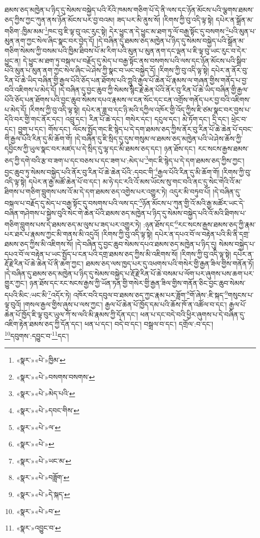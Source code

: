 ཐམས་ཅད་མཁྱེན་པ་ཉིད་དུ་སེམས་བསྐྱེད་པའི་རོའི་ཁམས་གཅིག་པོ་དེ་ནི་ལས་དང་ཉོན་མོངས་པའི་ལྕགས་ཐམས་ཅད་ཀྱིས་ཀྱང་ཀུན་ནས་ཉོན་མོངས་པར་བྱ་བའམ། ཟད་པར་མི་ནུས་སོ། །རིགས་ཀྱི་བུ་འདི་ལྟ་སྟེ། དཔེར་ན་སྒྲོན་མ་གཅིག་:ཁྱིམ་མམ་\footnote{«སྣར་»«པེ་»ཁྱིམ་}ཁང་བུ་ཇི་ལྟ་བུ་འང་རུང་སྟེ། དེར་ཕྱུང་ན་དེ་ཕྱུང་མ་ཐག་ཏུ་ལོ་བརྒྱ་སྟོང་དུ་བསགས་\footnote{«སྣར་»«པེ་»བསགས་བསགས་}པའི་མུན་པ་མུན་ནག་ཀྱང་སེལ་ཞིང་སྣང་བར་བྱེད་དོ། །དེ་བཞིན་དུ་ཐམས་ཅད་མཁྱེན་པ་ཉིད་དུ་སེམས་བསྐྱེད་པའི་སྒྲོན་མ་གཅིག་སེམས་ཀྱི་བསམ་པའི་ཁྱིམ་ཐིབས་པོ་མ་རིག་པའི་མུན་པ་མུན་ནག་དང་ལྡན་པ་ཇི་ལྟ་བུ་ཡང་རུང་བ་དེར་ཕྱུང་ན། དེ་ཕྱུང་མ་ཐག་ཏུ་བསྐལ་པ་བརྗོད་དུ་མེད་པ་བརྒྱ་སྟོང་ནས་བསགས་པའི་ལས་དང་ཉོན་མོངས་པའི་སྒྲིབ་པའི་མུན་པ་མུན་ནག་ཀྱང་སེལ་ཞིང་ཡེ་ཤེས་ཀྱི་སྣང་བ་ཡང་བསྐྱེད་དོ། །རིགས་ཀྱི་བུ་འདི་ལྟ་སྟེ། དཔེར་ན་ནོར་བུ་རིན་པོ་ཆེ་ཡིད་བཞིན་གྱི་རྒྱལ་པོའི་ཅོད་པན་ཐོགས་པའི་ཀླུའི་རྒྱལ་པོ་ཆེན་པོ་རྣམས་ལ་གཞན་གྱིས་གནོད་པ་བྱ་བའི་འཇིགས་པ་མེད་དོ། །དེ་བཞིན་དུ་བྱང་ཆུབ་ཀྱི་སེམས་སྙིང་རྗེ་ཆེན་པོའི་ནོར་བུ་རིན་པོ་ཆེ་ཡིད་བཞིན་གྱི་རྒྱལ་པོའི་ཅོད་པན་ཐོགས་པའི་བྱང་ཆུབ་སེམས་དཔའ་རྣམས་ལ་ངན་སོང་དང་ངན་འགྲོས་གནོད་པར་བྱ་བའི་འཇིགས་པ་མེད་དོ། །རིགས་ཀྱི་བུ་འདི་ལྟ་སྟེ། དཔེར་ན་ཟླ་བ་དང་ཉི་མའི་དཀྱིལ་འཁོར་གྱི་འོད་ཀྱིས་ཇི་ཙམ་སྣང་བར་བྱས་པ་དེའི་བར་གྱི་གང་ནོར་དང་། འབྲུ་དང་། རིན་པོ་ཆེ་དང་། གསེར་དང་། དངུལ་དང་། མེ་ཏོག་དང་། དྲི་དང་། ཕྲེང་བ་དང་། བྱུག་པ་དང་། གོས་དང་། ལོངས་སྤྱོད་གང་ཇི་སྙེད་པ་དེ་དག་ཐམས་ཅད་ཀྱིས་ནོར་བུ་རིན་པོ་ཆེ་ཆེན་པོ་དབང་གི་རྒྱལ་པོའི་རིན་དུ་མི་ཆོག་གོ། །དེ་བཞིན་དུ་ཇི་སྲིད་དུ་དུས་གསུམ་ལ་ཐམས་ཅད་མཁྱེན་པའི་ཡེ་ཤེས་ཆོས་ཀྱི་དབྱིངས་ཀྱི་ཡུལ་སྣང་བར་མཛད་པ་དེ་སྲིད་དུ་ལྷ་དང་མི་ཐམས་ཅད་དང་། ཉན་ཐོས་དང་། རང་སངས་རྒྱས་ཐམས་ཅད་ཀྱི་དགེ་བའི་རྩ་བ་ཟག་པ་དང་བཅས་པ་དང་ཟག་པ་:མེད་པ་\footnote{«སྣར་»«པེ་»མེད་པའི་}གང་ཇི་སྙེད་པ་དེ་དག་ཐམས་ཅད་ཀྱིས་ཀྱང་། བྱང་ཆུབ་ཏུ་སེམས་བསྐྱེད་པའི་ནོར་བུ་རིན་པོ་ཆེ་ཆེན་པོའི་:དབང་གི་\footnote{«སྣར་»«པེ་»དབང་གིས་}རྒྱལ་པོའི་རིན་དུ་མི་ཆོག་གོ། །རིགས་ཀྱི་བུ་འདི་ལྟ་སྟེ། དཔེར་ན་རྒྱ་མཚོ་ཆེན་པོ་བ་དང་། མ་ཧེ་དང་རའི་འོ་མས་ཡོངས་སུ་གང་བའི་ནང་དུ་སེང་གེའི་འོ་མ་ཐིགས་པ་གཅིག་བླུགས་པས་འོ་མ་དེ་དག་ཐམས་ཅད་འགྱེས་པར་འགྱུར་ཏེ། འདུར་མི་བཏུབ་པོ། །དེ་བཞིན་དུ་བསྐལ་པ་བརྗོད་དུ་མེད་པ་བརྒྱ་སྟོང་དུ་བསགས་པའི་ལས་དང་\footnote{«སྣར་»«པེ་»ལ་}ཉོན་མོངས་པ་ཀུན་གྱི་འོ་མའི་རྒྱ་མཚོར་ཡང་དེ་བཞིན་གཤེགས་པ་སྐྱེས་བུའི་སེང་གེ་ཆེན་པོའི་ཐམས་ཅད་མཁྱེན་པ་ཉིད་དུ་སེམས་བསྐྱེད་པའི་འོ་མའི་ཐིགས་པ་གཅིག་བླུགས་པས་དེ་ཐམས་ཅད་མ་ལུས་པ་ཟད་པར་འགྱུར་ཏེ། :ཉན་ཐོས་དང་\footnote{«སྣར་»«པེ་»}རང་སངས་རྒྱས་ཐམས་ཅད་ཀྱི་རྣམ་པར་ཐར་པ་རྣམས་ཀྱང་མི་གནས་མི་འདུའོ། །རིགས་ཀྱི་བུ་འདི་ལྟ་སྟེ། དཔེར་ན་དཔའ་བོ་ལ་བརྟེན་པའི་མི་ནི་དགྲ་ཐམས་ཅད་ཀྱིས་མི་འཇིགས་སོ། །དེ་བཞིན་དུ་བྱང་ཆུབ་སེམས་དཔའ་ཐམས་ཅད་མཁྱེན་པ་ཉིད་དུ། སེམས་བསྐྱེད་པ་དཔའ་བོ་ལ་བརྟེན་པ་ཡང་སྤྱོད་པ་ངན་པའི་དགྲ་ཐམས་ཅད་ཀྱིས་མི་འཇིགས་སོ། །རིགས་ཀྱི་བུ་འདི་ལྟ་སྟེ། དཔེར་ན་རྡོ་རྗེ་རིན་པོ་ཆེ་ཆེན་པོ་ནི་ཆག་ཀྱང་། ཐམས་ཅད་ལས་ཁྱད་པར་དུ་འཕགས་པའི་གསེར་གྱི་རྒྱན་ཟིལ་གྱིས་གནོན་ཏོ། །དེ་བཞིན་དུ་ཐམས་ཅད་མཁྱེན་པ་ཉིད་དུ་སེམས་བསྐྱེད་པ་རྡོ་རྗེ་རིན་པོ་ཆེ་བསམ་པ་ལོག་པར་ཞུགས་པས་ཆག་པར་གྱུར་ཀྱང་། ཉན་ཐོས་དང་རང་སངས་རྒྱས་ཀྱི་ཡོན་ཏན་གྱི་གསེར་གྱི་རྒྱན་ཟིལ་གྱིས་གནོན་ཅིང་བྱང་ཆུབ་སེམས་དཔའི་མིང་:ཡང་མི་\footnote{«སྣར་»«པེ་»ཡང་མ་}འདོར་ཏེ། འཁོར་བའི་དབུལ་བ་ཐམས་ཅད་ཀྱང་རྣམ་པར་ཟློག་\footnote{«སྣར་»«པེ་»བཟློག་}གོ་ཞེས་:ཇི་སྐད་\footnote{«སྣར་»«པེ་»དེ་སྐད་}གསུངས་པ་ལྟ་བུའོ། །གསལ་རྒྱལ་གྱིས་ཞུས་པ་ལས་ཀྱང་། རྒྱལ་པོ་ཆེན་པོ་ཁྱོད་དམ་པའི་ཆོས་ཁོ་ན་འཚོལ་བ་དང་། རྒྱལ་པོ་ཆེན་པོ་ཁྱོད་ཇི་ལྟ་བུར་ཡུལ་ཀོ་ས་ལའི་མི་རྣམས་ཀྱི་དོན་དང་། ཕན་པ་དང་བདེ་བའི་ཕྱིར་ཞུགས་པ་དེ་བཞིན་དུ་འཇིག་རྟེན་ཐམས་ཅད་ཀྱི་དོན་དང་། ཕན་པ་དང་། བདེ་བ་དང་། བསྒྲལ་བ་དང་། དགྲོལ་:བ་དང་། \footnote{«སྣར་»«པེ་»བ་}དབུགས་:དབྱུང་བ་\footnote{«སྣར་»འབྱུང་བ་}དང་། 